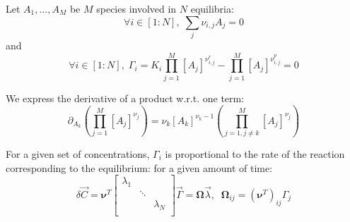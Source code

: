 \documentclass[aps,12pt]{revtex4}
\begin{document}
Let $A_1,\ldots,A_M$ be $M$ species involved in $N$ equilibria:
\begin{equation}
	\forall i\in[1:N], \; \sum_j \nu_{i,j} A_j = 0
\end{equation}
and
\begin{equation}
	\forall i\in[1:N], \; 
	\Gamma_i = K_i \prod_{j=1}^{M} [A_j]^{\nu^r_{i,j}} 
	- \prod_{j=1}^{M} [A_j]^{\nu^p_{i,j}} = 0
\end{equation}

We express the derivative of a product w.r.t. one term:
\begin{equation}
	\partial_{A_k} \left( \prod_{j=1}^{M} [A_j]^{\nu_{j}} \right)  =
	\nu_k [A_k]^{\nu_k-1} \left( \prod_{j=1,j\not=k}^{M} [A_j]^{\nu_{j}} \right)
\end{equation}

For a given set of concentrations, $\Gamma_i$ is proportional
to the rate of the reaction corresponding to the equilibrium:
for a given amount of time:
\begin{equation}
	\delta \vec{C} = \bm{\nu}^T
	\begin{bmatrix}
	\lambda_1 & & \\
	 & \ddots & \\
	 & & \lambda_N \\
	\end{bmatrix}
	\vec{\Gamma}
	= \bm{\Omega} \vec{\lambda}, \;\; \bm{\Omega}_{ij} = \left(\bm{\nu}^T\right)_{ij} \Gamma_j
\end{equation}
\end{document}
